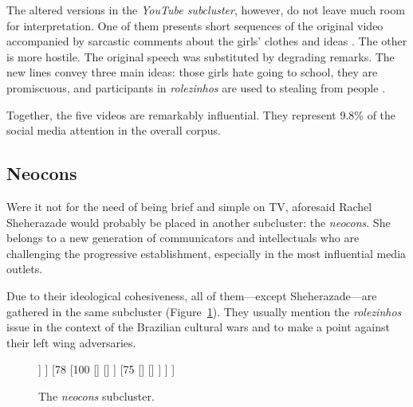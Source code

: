 The altered versions in the \emph{YouTube subcluster}, however, do not leave much room for interpretation. One of them presents short sequences of the original video accompanied by sarcastic comments about the girls' clothes and ideas \autocite{diva_rolezeiras}. The other is more hostile. The original speech was substituted by degrading remarks. The new lines convey three main ideas: those girls hate going to school, they are promiscuous, and participants in \emph{rolezinhos} are used to stealing from people \autocite{youtube_parodia_rolezeiras}.

Together, the five videos are remarkably influential. They represent 9.8\% of the social media attention in the overall corpus.

\subsection*{Neocons}
\label{sec:neocons}

Were it not for the need of being brief and simple on TV, aforesaid Rachel Sheherazade would probably be placed in another subcluster: the \emph{neocons}. She belongs to a new generation of communicators and intellectuals who are challenging the progressive establishment, especially in the most influential media outlets.

Due to their ideological cohesiveness, all of them---except Sheherazade---are gathered in the same subcluster (Figure~\ref{neocons_subcluster}). They usually mention the \emph{rolezinhos} issue in the context of the Brazilian cultural wars and to make a point against their left wing adversaries.

\begin{figure}
\centering
\begin{forest}
[80, for tree={grow=east,anchor=west,child anchor=west}
	[78
		[{\autocite[][Azevedo: \emph{Rolezinho} and cheap illusions]{reinaldo_mistificacoes}}]
		[78
			[{\autocite[][Azevedo: Black blocs and \emph{rolezinhos}]{reinaldo_advogado}}]
			[{\autocite[][Pondé: Double standard]{folha_ponde}}]
		]
	]
	[78
		[100
			[{\autocite[][Azevedo: On \emph{Folha de S. Paulo} survey]{reinaldo_datafolha}}]
			[{\autocite[][Azevedo: Workers' Party and social unrest]{reinaldo_paucome}}]
		]
		[75
			[{\autocite[][Constantino: \emph{Rolezinho} and barbarism]{constantino_barbarie}}]
			[{\autocite[][\emph{Folha de S. Paulo}: 82\% against \emph{rolezinhos}]{folha_datafolha}}]
		]
	]
]
\end{forest}
\caption{The \emph{neocons} subcluster.}
\label{neocons_subcluster}
\end{figure}

